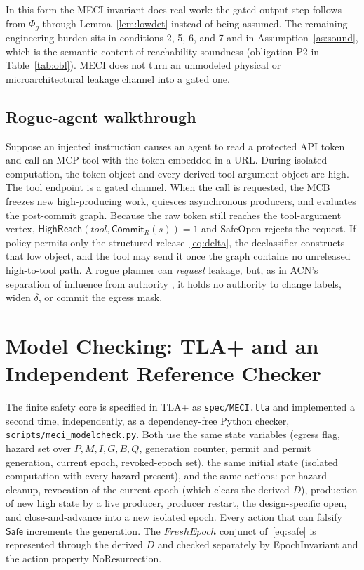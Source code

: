 \documentclass[11pt,letterpaper]{article}
\theoremstyle{plain}
\theoremstyle{definition}
\newcommand{\HR}{\mathsf{HighReach}}
\newcommand{\Safe}{\mathsf{Safe}}
\newcommand{\Commit}{\mathsf{Commit}}
\begin{document}
In this form the MECI invariant does real work: the gated-output step follows from $\Phi_g$ through Lemma~\ref{lem:lowdet} instead of being assumed. The remaining engineering burden sits in conditions 2, 5, 6, and 7 and in Assumption~\ref{as:sound}, which is the semantic content of reachability soundness (obligation P2 in Table~\ref{tab:obl}). MECI does not turn an unmodeled physical or microarchitectural leakage channel into a gated one.

\subsection{Rogue-agent walkthrough}\label{sec:rogue}
Suppose an injected instruction causes an agent to read a protected API token and call an MCP tool with the token embedded in a URL. During isolated computation, the token object and every derived tool-argument object are high. The tool endpoint is a gated channel. When the call is requested, the MCB freezes new high-producing work, quiesces asynchronous producers, and evaluates the post-commit graph. Because the raw token still reaches the tool-argument vertex, $\HR(\mathit{tool}, \Commit_R(s)) = 1$ and SafeOpen rejects the request. If policy permits only the structured release~\eqref{eq:delta}, the declassifier constructs that low object, and the tool may send it once the graph contains no unreleased high-to-tool path. A rogue planner can \emph{request} leakage, but, as in ACN's separation of influence from authority \cite{acn}, it holds no authority to change labels, widen $\delta$, or commit the egress mask.

\section{Model Checking: TLA+ and an Independent Reference Checker}\label{sec:check}

The finite safety core is specified in TLA+ \cite{lamport2002,tlatools} as \texttt{spec/MECI.tla} and implemented a second time, independently, as a dependency-free Python checker, \texttt{scripts/meci\_modelcheck.py}. Both use the same state variables (egress flag, hazard set over $P, M, I, G, B, Q$, generation counter, permit and permit generation, current epoch, revoked-epoch set), the same initial state (isolated computation with every hazard present), and the same actions: per-hazard cleanup, revocation of the current epoch (which clears the derived $D$), production of new high state by a live producer, producer restart, the design-specific open, and close-and-advance into a new isolated epoch. Every action that can falsify $\Safe$ increments the generation. The $\mathit{FreshEpoch}$ conjunct of~\eqref{eq:safe} is represented through the derived $D$ and checked separately by \textsf{EpochInvariant} and the action property \textsf{NoResurrection}.
\end{document}
